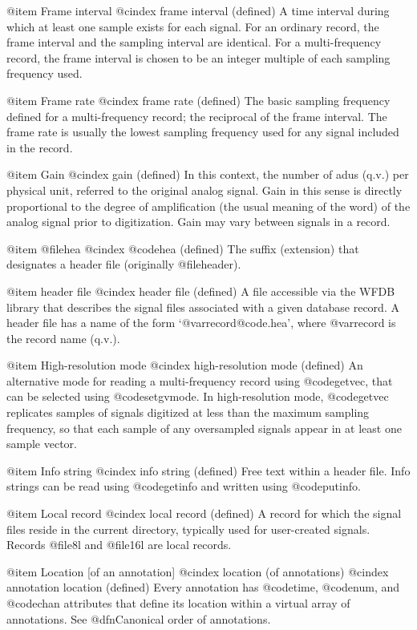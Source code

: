 {{{{{{{{@item Frame interval
@cindex frame interval (defined)
A time interval during which at least one sample exists for each signal.
For an ordinary record, the frame interval and the sampling interval are
identical.  For a multi-frequency record, the frame interval is chosen
to be an integer multiple of each sampling frequency used.

@item Frame rate
@cindex frame rate (defined)
The basic sampling frequency defined for a multi-frequency record;  the
reciprocal of the frame interval.  The frame rate is usually the lowest
sampling frequency used for any signal included in the record.

@item Gain
@cindex gain (defined)
In this context, the number of adus (q.v.) per physical unit, referred to the
original analog signal.  Gain in this sense is directly proportional to the
degree of amplification (the usual meaning of the word) of the analog
signal prior to digitization.  Gain may vary between signals in a
record.

@item @file{hea}
@cindex @code{hea} (defined)
The suffix (extension) that designates a header file (originally
@file{header}).

@item header file
@cindex header file (defined)
A file accessible via the WFDB library that describes the signal files
associated with a given database record.  A header file has a name of
the form `@var{record}@code{.hea}', where @var{record} is the record name
(q.v.).

@item High-resolution mode
@cindex high-resolution mode (defined)
An alternative mode for reading a multi-frequency record using
@code{getvec}, that can be selected using @code{setgvmode}.  In
high-resolution mode, @code{getvec} replicates samples of signals
digitized at less than the maximum sampling frequency, so that each
sample of any oversampled signals appear in at least one sample vector.

@item Info string
@cindex info string (defined)
Free text within a header file.  Info strings can be read using
@code{getinfo} and written using @code{putinfo}.

@item Local record
@cindex local record (defined)
A record for which the signal files reside in the current directory,
typically used for user-created signals.  Records @file{8l} and
@file{16l} are local records.

@item Location [of an annotation]
@cindex location (of annotations)
@cindex annotation location (defined)
Every annotation has @code{time}, @code{num}, and @code{chan} attributes that
define its location within a virtual array of annotations.  See
@dfn{Canonical order of annotations}.

}}}}}}}}
